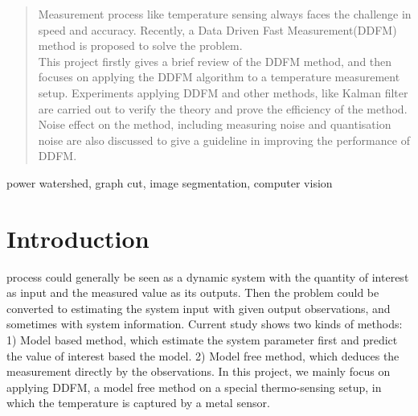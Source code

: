 \documentclass[journal]{IEEEtran}
\begin{document}
\begin{abstract}
Measurement process like temperature sensing always faces the challenge in speed and accuracy. Recently, a Data Driven Fast Measurement(DDFM) method is proposed to solve the problem. \\
This project firstly gives a brief review of the DDFM method, and then focuses on applying the DDFM algorithm to a temperature measurement setup. Experiments applying DDFM and other methods, like Kalman filter are carried out to verify the theory and prove the efficiency of the method. Noise effect on the method, including measuring noise and quantisation noise are also discussed to give a guideline in improving the performance of DDFM. 

\end{abstract}

\begin{IEEEkeywords}
power watershed, graph cut, image segmentation, computer vision 
\end{IEEEkeywords}


\section{Introduction}
% 
% 
% 
% 


 process could generally be seen as a dynamic system with the quantity of interest as input and the measured value as its outputs. Then the problem could be converted to estimating the system input with given output observations, and sometimes with system information. Current study shows two kinds of methods: 1) Model based method, which estimate the system parameter first and predict the value of interest based the model. 2) Model free method, which deduces the measurement directly by the observations. In this project, we mainly focus on applying DDFM, a model free method on a special thermo-sensing setup, in which the temperature is captured by a metal sensor.
\end{document}
